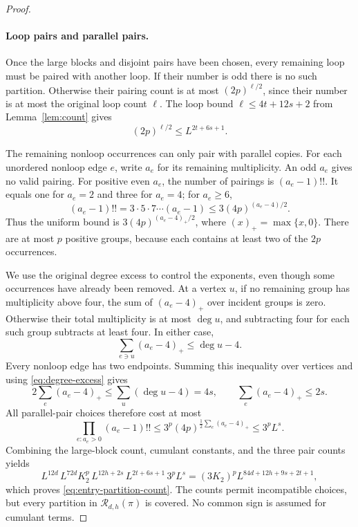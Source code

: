 \documentclass[11pt]{article}
\theoremstyle{definition}
\theoremstyle{remark}
\theoremstyle{plain}
\begin{document}
\begin{proof}
\paragraph{Loop pairs and parallel pairs.}
Once the large blocks and disjoint pairs have been chosen, every
remaining loop must be paired with another loop. If their number
is odd there is no such partition. Otherwise their pairing count
is at most $(2p)^{\ell/2}$, since their number is at most the
original loop count $\ell$. The loop bound
$\ell\le4t+12s+2$ from Lemma~\ref{lem:count} gives
\begin{equation}\label{eq:loop-pair-count}
                  (2p)^{\ell/2}\le L^{2t+6s+1}.
\end{equation}

The remaining nonloop occurrences can only pair with parallel
copies. For each unordered nonloop edge $e$, write $a_e$ for its
remaining multiplicity. An odd $a_e$ gives no valid pairing.
For positive even $a_e$, the number of pairings is $(a_e-1)!!$.
It equals one for $a_e=2$ and three for $a_e=4$; for $a_e\ge6$,
\[
 (a_e-1)!!=3\cdot5\cdot7\cdots(a_e-1)
       \le3(4p)^{(a_e-4)/2}.
\]
Thus the uniform bound is $3(4p)^{(a_e-4)_+/2}$, where
$(x)_+=\max\{x,0\}$. There are at most $p$ positive groups,
because each contains at least two of the $2p$ occurrences.

We use the original degree excess to control the exponents, even
though some occurrences have already been removed. At a vertex
$u$, if no remaining group has multiplicity above four, the sum
of $(a_e-4)_+$ over incident groups is zero. Otherwise their total
multiplicity is at most $\deg u$, and subtracting four for each
such group subtracts at least four. In either case,
\[
 \sum_{e\ni u}(a_e-4)_+\le\deg u-4.
\]
Every nonloop edge has two endpoints. Summing this inequality over
vertices and using \eqref{eq:degree-excess} gives
\[
 2\sum_e(a_e-4)_+\le\sum_u(\deg u-4)=4s,
 \qquad \sum_e(a_e-4)_+\le2s.
\]
All parallel-pair choices therefore cost at most
\[
 \prod_{e:a_e>0}(a_e-1)!!
       \le3^p(4p)^{\frac12\sum_e(a_e-4)_+}\le3^pL^s.
\]
Combining the large-block count, cumulant constants, and the three
pair counts yields
\[
 L^{12d}\,L^{72d}K_2^p\,L^{12h+2s}\,
 L^{2t+6s+1}\,3^pL^s
       =(3K_2)^pL^{84d+12h+9s+2t+1},
\]
which proves \eqref{eq:entry-partition-count}. The counts permit
incompatible choices, but every partition in
$\mathcal R_{d,h}(\pi)$ is covered. No common sign is assumed
for cumulant terms.


\end{proof}
\end{document}

